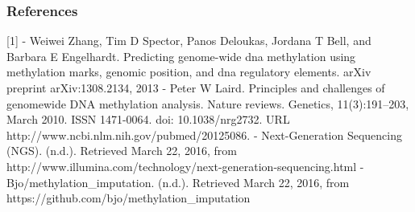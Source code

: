 \documentclass{article} %
\begin{document}
\subsubsection*{References}
[1] - Weiwei Zhang, Tim D Spector, Panos Deloukas, Jordana T Bell, and Barbara E Engelhardt. Predicting genome-wide dna methylation using methylation marks, genomic position, and dna regulatory elements. arXiv preprint arXiv:1308.2134, 2013
\newline
\newline
[2] - Peter W Laird. Principles and challenges of genomewide DNA methylation analysis. Nature reviews. Genetics, 11(3):191–203, March 2010. ISSN 1471-0064. doi: 10.1038/nrg2732. URL http://www.ncbi.nlm.nih.gov/pubmed/20125086.
\newline
\newline
[3] - Next-Generation Sequencing (NGS). (n.d.). Retrieved March 22, 2016, from http://www.illumina.com/technology/next-generation-sequencing.html
\newline
\newline
[4] - Bjo/methylation\_imputation. (n.d.). Retrieved March 22, 2016, from https://github.com/bjo/methylation\_imputation
\end{document}
